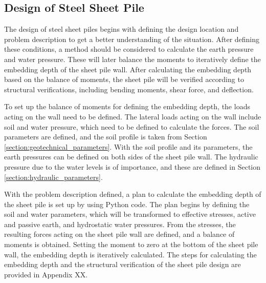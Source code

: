 



\newpage

\subsection{Design of Steel Sheet Pile}

The design of steel sheet piles begins with defining the design location and problem description to get a better understanding of the situation. After defining these conditions, a method should be considered to calculate the earth pressure and water pressure. These will later balance the moments to iteratively define the embedding depth of the sheet pile wall. After calculating the embedding depth based on the balance of moments, the sheet pile will be verified according to structural verifications, including bending moments, shear force, and deflection.  

To set up the balance of moments for defining the embedding depth, the loads acting on the wall need to be defined. The lateral loads acting on the wall include soil and water pressure, which need to be defined to calculate the forces. The soil parameters are defined, and the soil profile is taken from Section \ref{section:geotechnical_parameters}. With the soil profile and its parameters, the earth pressures can be defined on both sides of the sheet pile wall. The hydraulic pressure due to the water levels is of importance, and these are defined in Section \ref{section:hydraulic_parameters}. 

With the problem description defined, a plan to calculate the embedding depth of the sheet pile is set up by using Python code. The plan begins by defining the soil and water parameters, which will be transformed to effective stresses, active and passive earth, and hydrostatic water pressures. From the stresses, the resulting forces acting on the sheet pile wall are defined, and a balance of moments is obtained. Setting the moment to zero at the bottom of the sheet pile wall, the embedding depth is iteratively calculated. The steps for calculating the embedding depth and the structural verification of the sheet pile design are provided in Appendix XX.

